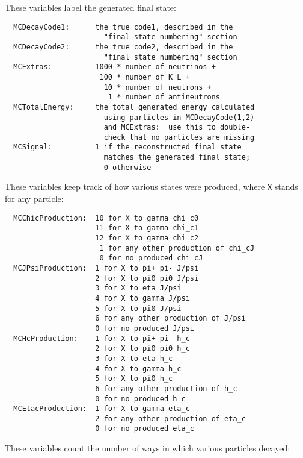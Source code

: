 \documentclass[11pt]{article}
\begin{document}
These variables label the generated final state:
\begin{verbatim}
  MCDecayCode1:      the true code1, described in the
                       "final state numbering" section
  MCDecayCode2:      the true code2, described in the
                       "final state numbering" section
  MCExtras:          1000 * number of neutrinos +
                      100 * number of K_L +
                       10 * number of neutrons +
                        1 * number of antineutrons
  MCTotalEnergy:     the total generated energy calculated
                       using particles in MCDecayCode(1,2)
                       and MCExtras:  use this to double-
                       check that no particles are missing
  MCSignal:          1 if the reconstructed final state
                       matches the generated final state;
                       0 otherwise
\end{verbatim}
These variables keep track of how various states were produced, where {\tt X} stands for any particle:
\begin{verbatim}
  MCChicProduction:  10 for X to gamma chi_c0
                     11 for X to gamma chi_c1
                     12 for X to gamma chi_c2
                      1 for any other production of chi_cJ
                      0 for no produced chi_cJ
  MCJPsiProduction:  1 for X to pi+ pi- J/psi
                     2 for X to pi0 pi0 J/psi
                     3 for X to eta J/psi
                     4 for X to gamma J/psi
                     5 for X to pi0 J/psi
                     6 for any other production of J/psi
                     0 for no produced J/psi
  MCHcProduction:    1 for X to pi+ pi- h_c
                     2 for X to pi0 pi0 h_c
                     3 for X to eta h_c
                     4 for X to gamma h_c
                     5 for X to pi0 h_c
                     6 for any other production of h_c
                     0 for no produced h_c
  MCEtacProduction:  1 for X to gamma eta_c
                     2 for any other production of eta_c
                     0 for no produced eta_c
\end{verbatim}
These variables count the number of ways in which various particles decayed:
\end{document}
